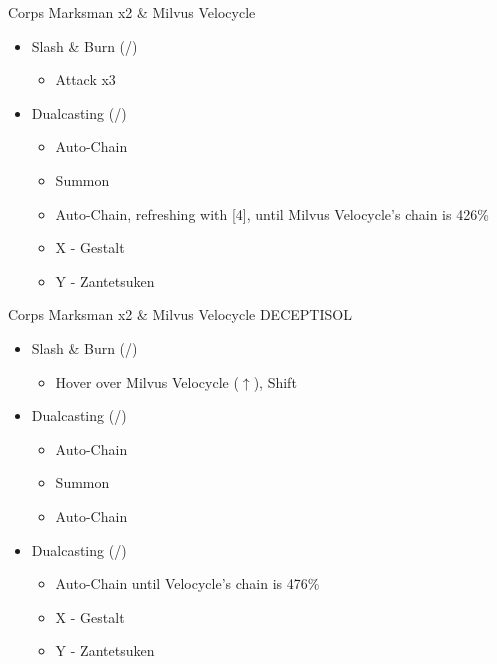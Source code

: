 \renewcommand{\first}{[1] Slash \& Burn (\com/\rav)}
\renewcommand{\second}{[2] War \& Peace (\com/\med)}
\renewcommand{\third}{[3] Supersoldier (\com/\syn)}
\renewcommand{\fourth}{[4] Dualcasting (\rav/\rav)}
\renewcommand{\fifth}{[5] Dualcasting (\rav/\rav)}
\renewcommand{\sixth}{[6] Slash \& Burn (\com/\rav)}
\begin{battle}[0:33]{Corps Marksman x2 \& Milvus Velocycle}
		\begin{itemize}
			\item \first
			      \begin{itemize}
				      \item Attack x3
			      \end{itemize}
			\item \fifth
			      \begin{itemize}
				      \item Auto-Chain
				      \item Summon
				      \item Auto-Chain, refreshing with [4], until Milvus Velocycle's chain is 426\%
				      \item X - Gestalt
				      \item Y - Zantetsuken
			      \end{itemize}
		\end{itemize}
\end{battle}
\begin{battle}[0:18]{Corps Marksman x2 \& Milvus Velocycle DECEPTISOL}
\begin{itemize}

			\item \first
			      \begin{itemize}
				      \item Hover over Milvus Velocycle ($\uparrow$), Shift
			      \end{itemize}
			\item \fifth
			      \begin{itemize}
				      \item Auto-Chain
				      \item Summon
				      \item Auto-Chain
			      \end{itemize}
			\item \fourth
			      \begin{itemize}
				      \item Auto-Chain until Velocycle's chain is 476\%
				      \item X - Gestalt
				      \item Y - Zantetsuken
			      \end{itemize}
			      \end{itemize}
\end{battle}

